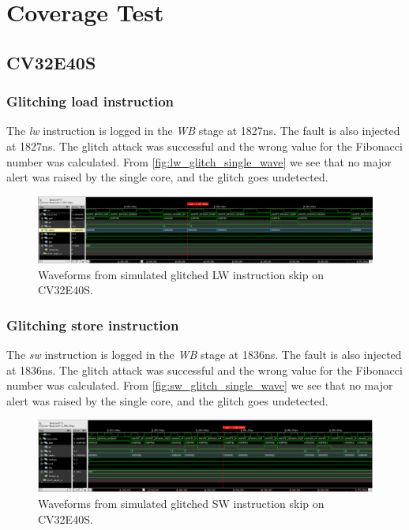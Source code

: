 \section{Coverage Test}
\label{sec:cov_test_result}

\subsection{CV32E40S}

\subsubsection{Glitching load instruction}

The \textit{lw} instruction is logged in the \textit{WB} stage at 1827ns. The fault is also injected at 1827ns. The glitch attack was successful and the wrong value for the Fibonacci number was calculated. From \autoref{fig:lw_glitch_single_wave} we see that no major alert was raised by the single core, and the glitch goes undetected. 

\begin{figure}[h!]
    \centering
    \includegraphics[width=\textwidth]{docs/images/lw_glitch_single_core.png}
    \caption{Waveforms from simulated glitched LW instruction skip on CV32E40S.}
    \label{fig:lw_glitch_single_wave}
\end{figure}

\subsubsection{Glitching store instruction}

The \textit{sw} instruction is logged in the \textit{WB} stage at 1836ns. The fault is also injected at 1836ns. The glitch attack was successful and the wrong value for the Fibonacci number was calculated. From \autoref{fig:sw_glitch_single_wave} we see that no major alert was raised by the single core, and the glitch goes undetected. 

\begin{figure}[h!]
    \centering
    \includegraphics[width=\textwidth]{docs/images/sw_glitch_single_core.png}
    \caption{Waveforms from simulated glitched SW instruction skip on CV32E40S.}
    \label{fig:sw_glitch_single_wave}
\end{figure}


